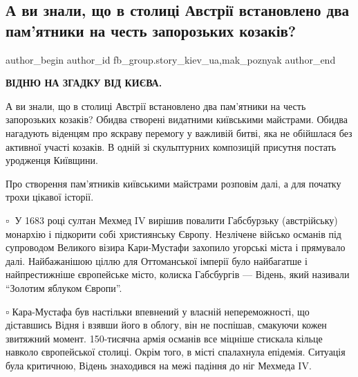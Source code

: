  
 
 
 
 

\subsection{А ви знали, що в столиці Австрії встановлено два пам'ятники на честь запорозьких козаків?}
\label{sec:23_01_2023.fb.fb_group.story_kiev_ua.1.a_vi_znali__shcho_v_}
 
\ifcmt
 author_begin
   author_id fb_group.story_kiev_ua,mak_poznyak
 author_end
\fi

\textbf{ВІДНЮ НА ЗГАДКУ ВІД КИЄВА.}

А ви знали, що в столиці Австрії встановлено два пам'ятники на честь
запорозьких козаків? Обидва створені видатними київськими майстрами. Обидва
нагадують віденцям про яскраву перемогу у важливій битві, яка не обійшлася без
активної участі козаків. В одній зі скульптурних композицій присутня постать
уродженця Київщини.

Про створення пам'ятників київськими майстрами розповім далі, а для початку
трохи цікавої історії.

▫️📖 У 1683 році султан Мехмед IV вирішив повалити Габсбурзьку (австрійську)
монархію і підкорити собі християнську Європу. Незлічене військо османів під
супроводом Великого візира Кари-Мустафи захопило угорські міста і прямувало
далі. Найбажанішою ціллю для Оттоманської імперії було найбагатше і
найпрестижніше європейське місто, колиска Габсбургів — Відень, який називали
\enquote{Золотим яблуком Європи}.

▫️ Кара-Мустафа був настільки впевнений у власній непереможності, що діставшись
Відня і взявши його в облогу, він не поспішав, смакуючи кожен звитяжний момент.
150-тисячна армія османів все міцніше стискала кільце навколо європейської
столиці. Окрім того, в місті спалахнула епідемія. Ситуація була критичною,
Відень знаходився на межі падіння до ніг Мехмеда IV.

